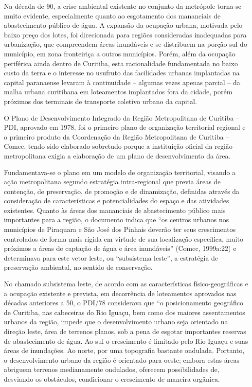 	Na década de 90, a crise ambiental existente no conjunto da metrópole torna-se muito evidente, especialmente quanto ao esgotamento dos mananciais de abastecimento público de água. A expansão da ocupação urbana, motivada pelo baixo preço dos lotes, foi direcionada para regiões consideradas inadequadas para urbanização, que compreendem áreas inundáveis e se distribuem na porção sul do município, em zona fronteiriça a outros municípios. Porém, além da ocupação periférica ainda dentro de Curitiba, esta racionalidade fundamentada no baixo custo da terra e o interesse no usufruto das facilidades urbanas implantadas na capital paranaense levaram à continuidade – algumas vezes apenas parcial – da malha urbana curitibana em loteamentos implantados fora da cidade, porém próximos dos terminais de transporte coletivo urbano da capital.
	
	O Plano de Desenvolvimento Integrado da Região Metropolitana de Curitiba – PDI, aprovado em 1978, foi o primeiro plano de organização territorial regional e o primeiro produto da Coordenação da Região Metropolitana de Curitiba – Comec, tendo sido elaborado sobretudo porque a instituição oficial da região metropolitana exigia a elaboração de um plano de desenvolvimento da área.
	
	Fundamentava-se o plano em um modelo de organização territorial, visando a ação metropolitana segundo estratégia intra-regional que previa áreas de contenção, de preservação, de promoção e de dinamização, definidas através da consideração de características e potencialidades do espaço e das atividades existentes. Quanto às áreas dos mananciais de abastecimento público mais importantes para a região, o documento indica que “os centros urbanos nos municípios de Piraquara e São José dos Pinhais deverão ter seus crescimentos controlados de forma mais rígida em virtude de sua localização específica, muito próximos a áreas de captação de água e área inundáveis” (Comec, 1999a:22) e determinava para este vetor leste, ou “subsistema leste”, a estratégia de preservação ambiental, no sentido de conservação. 
	
	No chamado subsistema leste, de acordo com as características físico-geográficas e a ocupação existente e prevista, em decorrência de loteamentos aprovados nas décadas anteriores a 50, o PDI/78 considerava que “o posicionamento geográfico de Curitiba, nas cabeceiras do Rio Iguaçu, bem como dos maiores assentamentos urbanos da região, impede que o desenvolvimento urbano seja orientado na direção leste, área de terrenos planos, sob a pena de esgotar importantes reservas de abastecimento de água. Ao sul o crescimento é limitado pelo Rio Iguaçu e suas áreas de inundações. Ao norte, por uma topografia bastante ondulada. Portanto, o desenvolvimento urbano da região é orientado para oeste; embora estas áreas abriguem terrenos medianamente ondulados, oferecem possibilidades de, desviando os obstáculos, condicionar o crescimento de maneira orgânica.
	
